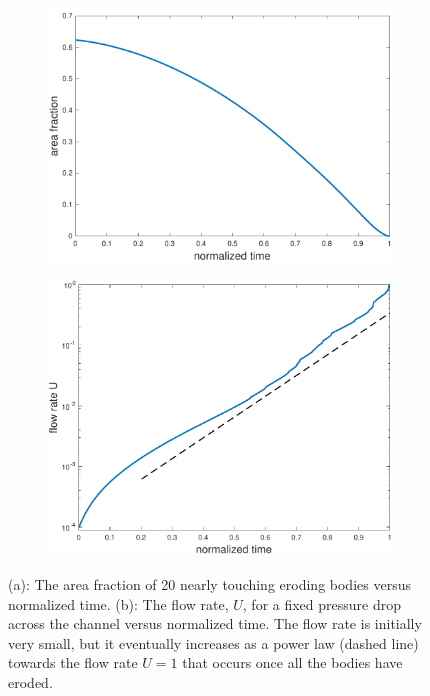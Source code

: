 \documentclass[preprint, 10pt]{elsarticle}
\begin{document}
\begin{figure}[H]
\begin{subfigure}[b]{0.5\textwidth}
\includegraphics*[height = 0.7\linewidth]{./figs/porosity20dense}
\caption{}
\end{subfigure}
\begin{subfigure}[b]{0.5\textwidth}
\includegraphics*[height = 0.7\linewidth]{./figs/flow_rate20dense}
\caption{}
\end{subfigure}
\caption{\label{fig:Eroding20flowrate}(a): The area fraction of 20
nearly touching eroding bodies versus normalized time. (b): The flow
rate, $U$, for a fixed pressure drop across the channel versus
normalized time.  The flow rate is initially very small, but it
eventually increases as a power law (dashed line) towards the flow rate
$U=1$ that occurs once all the bodies have eroded. }
\end{figure}
\end{document}
